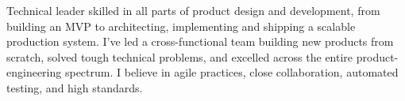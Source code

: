 

\begin{cvparagraph}

Technical leader skilled in all parts of product design and development, from building an MVP to architecting, implementing and shipping a scalable production system.
I've led a cross-functional team building new products from scratch, solved tough technical problems, and excelled across the entire product-engineering spectrum.
I believe in agile practices, close collaboration, automated testing, and high standards.

\end{cvparagraph}
